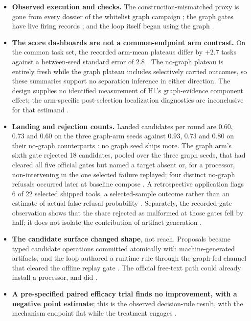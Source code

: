 \begin{itemize}
  \item \textbf{Observed execution and checks.} The construction-mismatched proxy is gone from every
        dossier of the whitelist graph campaign ; the graph gates have live firing records
        ; and the loop itself began using the graph .
  \item \textbf{The score dashboards are not a common-endpoint arm
        contrast.} On the common task set, the recorded arm-mean plateaus differ by $+2.7$ tasks against a between-seed
        standard error of $2.8$ . The no-graph plateau is entirely
        fresh while the graph plateau includes selectively carried outcomes,
        so these summaries support no separation inference in either
        direction. The design
        supplies no identified measurement of H1's graph-evidence component
        effect; the arm-specific post-selection localization diagnostics are
        inconclusive for that estimand .
  \item \textbf{Landing and rejection counts.}
        Landed candidates per round are $0.60$, $0.73$ and $0.60$ on the
        three graph-arm seeds against $0.93$, $0.73$ and $0.80$ on their
        no-graph counterparts : no graph seed ships more. The graph arm's
        sixth gate rejected 18 candidates, pooled over the three graph seeds,
        that had cleared all five official gates but named a target absent or,
        for a processor, non-intervening in the one selected failure replayed;
        four distinct no-graph refusals occurred later at baseline compose
        . A retrospective
        application flags 6 of 22 selected shipped
        tools, a selected-sample outcome rather than an estimate of actual
        false-refusal probability . Separately, the
        recorded-gate observation shows that the share rejected as malformed at
        those gates fell by half; it does not isolate the contribution of
        artifact generation .
  \item \textbf{The candidate surface changed shape}, not reach. Proposals
        became typed candidate operations committed atomically with machine-generated
        artifacts, and the loop authored a runtime rule through the
        graph-fed channel that cleared the offline replay gate .
        The official free-text path could already install a processor, and
        did .
  \item \textbf{A pre-specified paired efficacy trial finds no improvement, with a
        negative point estimate}; this is the observed decision-rule result,
        with the mechanism endpoint flat while the treatment engages .
\end{itemize}

